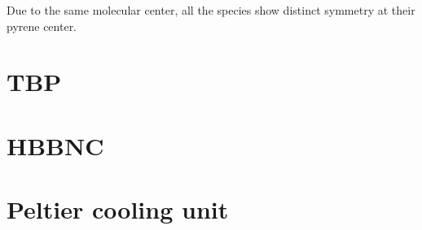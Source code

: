 \documentclass[
twoside,				%
BCOR=8mm,				%
headings=normal,		%
headsepline,			%
footsepline,			%
plainfootsepline,		%
]{scrbook}
\begin{document}
Due to the same molecular center, all the species show distinct symmetry at their pyrene center. 
%
%
  
  
  
  
\restoregeometry
 \section{TBP}
 
% 
\section{HBBNC}
 
\section{Peltier cooling unit}
 
\end{document}
